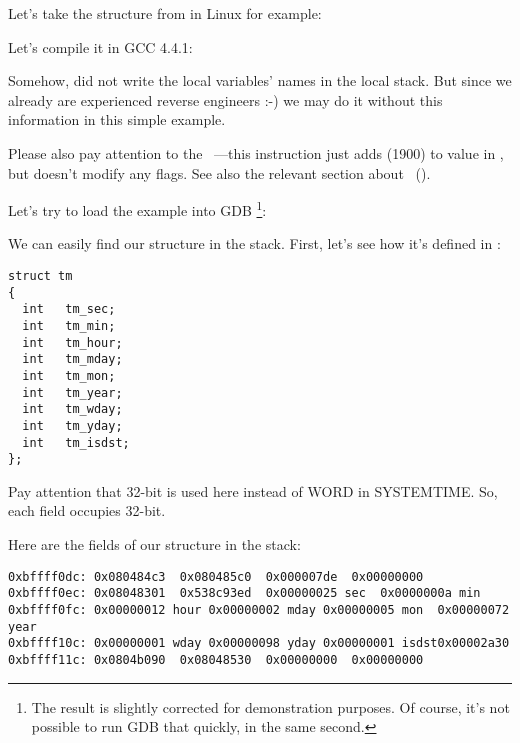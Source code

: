 ﻿

Let's take the  structure from  in Linux for example:



Let's compile it in GCC 4.4.1:



Somehow, \IDA did not write the local variables' names in the local stack.
But since we already are experienced reverse engineers :-) we may do it without this information in 
this simple example.


Please also pay attention to the ~---this instruction just adds  (1900) to value in \EAX,
but doesn't modify any flags. See also the relevant section about \LEA{}~().


Let's try to load the example into GDB
\footnote{The  result is slightly corrected for demonstration purposes.
Of course, it's not possible to run GDB that quickly, in the same second.}:



We can easily find our structure in the stack.
First, let's see how it's defined in :

\begin{lstlisting}[caption=time.h, label=struct_tm]
struct tm
{
  int	tm_sec;
  int	tm_min;
  int	tm_hour;
  int	tm_mday;
  int	tm_mon;
  int	tm_year;
  int	tm_wday;
  int	tm_yday;
  int	tm_isdst;
};
\end{lstlisting}

Pay attention that
32-bit \Tint is used here instead of WORD in SYSTEMTIME.
So, each field occupies 32-bit.

Here are the fields of our structure in the stack:

\begin{lstlisting}
0xbffff0dc:	0x080484c3	0x080485c0	0x000007de	0x00000000
0xbffff0ec:	0x08048301	0x538c93ed	0x00000025 sec	0x0000000a min
0xbffff0fc:	0x00000012 hour	0x00000002 mday	0x00000005 mon 	0x00000072 year
0xbffff10c:	0x00000001 wday	0x00000098 yday	0x00000001 isdst0x00002a30
0xbffff11c:	0x0804b090	0x08048530	0x00000000	0x00000000
\end{lstlisting}

